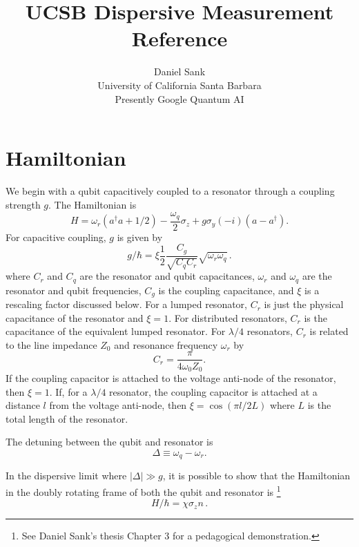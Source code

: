 \documentclass[twocolumn]{article}
\title{UCSB Dispersive Measurement Reference}
\author{Daniel Sank\\\small{University of California Santa Barbara}\\\small{Presently Google Quantum AI}}
\begin{document}
\maketitle

\section{Hamiltonian}

We begin with a qubit capacitively coupled to a resonator through a coupling strength $g$.
The Hamiltonian is \begin{equation}
H = \omega_r (a^{\dagger}a + 1/2) - \frac{\omega_q}{2} \sigma_z + g \sigma_y (-i)(a-a^{\dagger}).
\end{equation}
For capacitive coupling, $g$ is given by
\begin{equation}
g/\hbar = \xi \frac{1}{2} \frac{C_g}{\sqrt{C_q C_r}} \sqrt{\omega_r \omega_q} \, .
\end{equation}
where $C_r$ and $C_q$ are the resonator and qubit capacitances, $\omega_r$ and $\omega_q$ are the resonator and qubit frequencies, $C_g$ is the coupling capacitance, and $\xi$ is a rescaling factor discussed below.
For a lumped resonator, $C_r$ is just the physical capacitance of the resonator and $\xi=1$.
For distributed resonators, $C_r$ is the capacitance of the equivalent lumped resonator.
For $\lambda/4$ resonators, $C_r$ is related to the line impedance $Z_0$ and resonance frequency $\omega_r$ by
\begin{equation}
C_r = \frac{\pi}{4\omega_0 Z_0} .
\end{equation}
If the coupling capacitor is attached to the voltage anti-node of the resonator, then $\xi=1$.
If, for a $\lambda/4$ resonator, the coupling capacitor is attached at a distance $l$ from the voltage anti-node, then $\xi = \cos(\pi l /2 L)$ where $L$ is the total length of the resonator.

The detuning between the qubit and resonator is \begin{equation}
\Delta \equiv \omega_q - \omega_r .
\end{equation}

In the dispersive limit where $\left| \Delta \right| \gg g$, it is possible to show that the Hamiltonian in the doubly rotating frame of both the qubit and resonator is \footnote{See Daniel Sank's thesis Chapter 3 for a pedagogical demonstration.}
\begin{equation}
H/\hbar = \chi \sigma_z n \, .\label{eq:interactionHamiltonian}
\end{equation}
\end{document}
